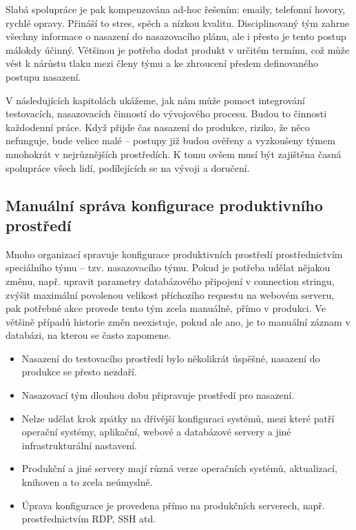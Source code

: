 Slabá spolupráce je pak kompenzována ad-hoc řešením: emaily, telefonní hovory, rychlé opravy. Přináší to stres, spěch a nízkou kvalitu. Disciplinovaný tým zahrne všechny informace o nasazení do nasazovacího plánu, ale i přesto je tento postup málokdy účinný. Většinou je potřeba dodat produkt v určitém termínu, což může vést k nárůstu tlaku mezi členy týmu a ke zhroucení předem definovaného postupu nasazení. 

V následujících kapitolách ukážeme, jak nám může pomoct integrování testovacích, nasazovacích činností do vývojového procesu. Budou to činnosti každodenní práce. Když přijde čas nasazení do produkce, riziko, že něco nefunguje, bude velice malé -- postupy již budou ověřeny a vyzkoušeny týmem mnohokrát v nejrůznějších prostředích. K tomu ovšem musí být zajištěna časná spolupráce všech lidí, podílejících se na vývoji a doručení.

\subsection{Manuální správa konfigurace produktivního prostředí}
Mnoho organizací spravuje konfigurace produktivních prostředí prostřednictvím speciálního týmu -- tzv. nasazovacího týmu. Pokud je potřeba udělat nějakou změnu, např. upravit parametry databázového připojení v connection stringu, zvýšit maximální povolenou velikost příchozího requestu na webovém serveru, pak potřebné akce provede tento tým zcela manuálně, přímo v produkci. Ve většině případů historie změn neexistuje, pokud ale ano, je to manuální záznam v databázi, na kterou se často zapomene.

\begin{itemize}
  \item Nasazení do testovacího prostředí bylo několikrát úspěšné, nasazení do produkce se přesto nezdaří.
  \item Nasazovací tým dlouhou dobu připravuje prostředí pro nasazení.
  \item Nelze udělat krok zpátky na dřívější konfiguraci systémů, mezi které patří operační systémy, aplikační, webové a databázové servery a jiné infrastrukturální nastavení.
  \item Produkční a jiné servery mají různá verze operačních systémů, aktualizací, knihoven a to zcela neúmyslně.
  \item Úprava konfigurace je provedena přímo na produkčních serverech, např. prostřednictvím RDP, SSH atd.
\end{itemize}

